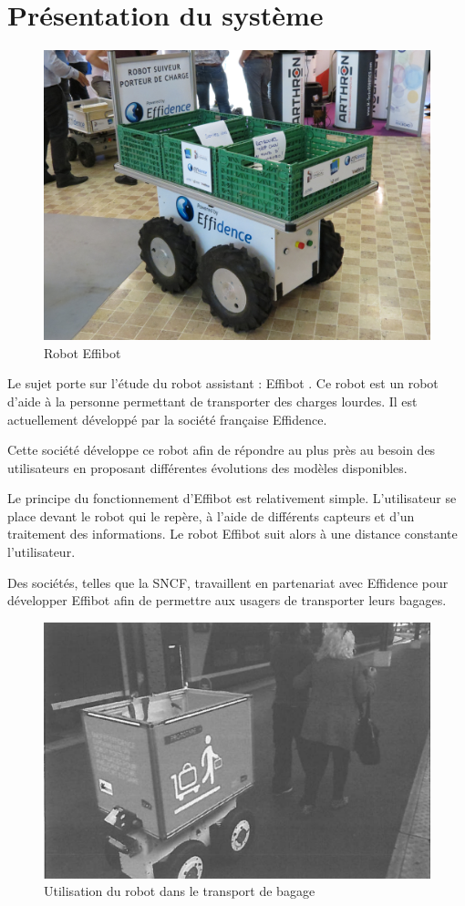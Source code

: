 

\section{Présentation du système}

\begin{figure}[ht!]
\begin{center}
 \includegraphics[width=0.6\linewidth]{img/fig01}
\end{center}
\caption{Robot \og Effibot\fg}
\label{fig01}
\end{figure}

Le sujet porte sur l'étude du robot assistant : \og Effibot \fg. Ce robot est un robot d'aide à la personne permettant de transporter des charges lourdes. Il est actuellement développé par la société française Effidence.

Cette société développe ce robot afin de répondre au plus près au besoin des utilisateurs en proposant différentes évolutions des modèles disponibles.

Le principe du fonctionnement d'\og Effibot \fg est relativement simple. L'utilisateur se place devant le robot qui le repère, à l'aide de différents capteurs et d'un traitement des informations. Le robot \og Effibot \fg suit
alors à une distance constante l'utilisateur.

Des sociétés, telles que la SNCF, travaillent en partenariat avec Effidence pour développer \og Effibot \fg afin de permettre aux usagers de transporter leurs bagages.

\begin{figure}[ht!]
\begin{center}
 \includegraphics[width=0.6\linewidth]{img/fig02}
\end{center}
\caption{Utilisation du robot dans le transport de bagage}
\label{fig02}
\end{figure}

